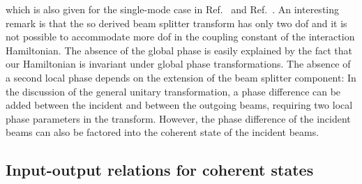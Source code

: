 which is also given for the single-mode case in Ref.~\cite[p.~96]{Leonhardt2003} and Ref.~\cite[p.~130]{Haroche2006}.
An interesting remark is that the so derived beam splitter transform has only two \gls{dof} and it is not possible to accommodate more \gls{dof} in the coupling constant of the interaction Hamiltonian.
The absence of the global phase is easily explained by the fact that our Hamiltonian is invariant under global phase transformations.
The absence of a second local phase depends on the extension of the beam splitter component:
In the discussion of the general unitary transformation, a phase difference can be added between the incident and between the outgoing beams, requiring two local phase parameters in the transform.
However, the phase difference of the incident beams can also be factored into the coherent state of the incident beams.

\FloatBarrier
\subsection{Input-output relations for coherent states}

